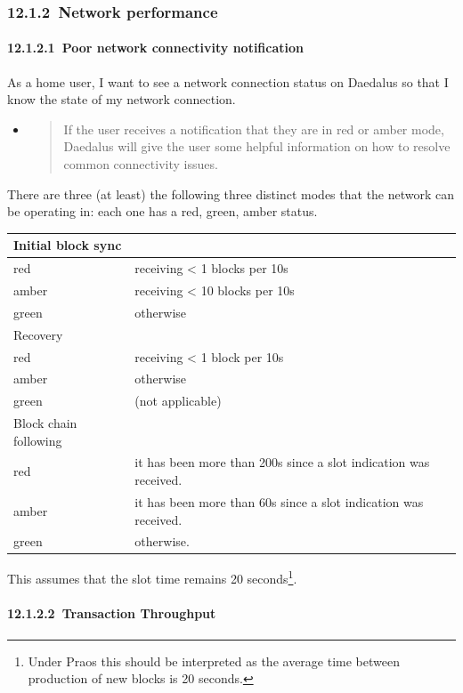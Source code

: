 \documentclass[11pt,a4paper]{article}
\begin{document}
\hypertarget{network-performance}{%
\subsubsection{​12.1.2​~Network performance}\label{network-performance}}

\hypertarget{poor-network-connectivity-notification}{%
\paragraph{​12.1.2.1​~Poor network connectivity notification
}\label{poor-network-connectivity-notification}}

As a home user, I want to see a network connection status on Daedalus so
that I know the state of my network connection.

\begin{itemize}
\item
  \begin{quote}
  If the user receives a notification that they are in red or amber
  mode, Daedalus will give the user some helpful information on how to
  resolve common connectivity issues.
  \end{quote}
\end{itemize}

There are three (at least) the following three distinct modes that the
network can be operating in: each one has a red, green, amber status.

\begin{longtable}[]{@{}ll@{}}
\toprule
Initial block sync &\tabularnewline
\midrule
\endhead
red & receiving \textless{} 1 blocks per 10s\tabularnewline
amber & receiving \textless{} 10 blocks per 10s\tabularnewline
green & otherwise\tabularnewline
Recovery &\tabularnewline
red & receiving \textless{} 1 block per 10s\tabularnewline
amber & otherwise\tabularnewline
green & (not applicable)\tabularnewline
Block chain following &\tabularnewline
red & it has been more than 200s since a slot indication was
received.\tabularnewline
amber & it has been more than 60s since a slot indication was
received.\tabularnewline
green & otherwise.\tabularnewline
\bottomrule
\end{longtable}

This assumes that the slot time remains 20 seconds\footnote{Under Praos
  this should be interpreted as the average time between production of
  new blocks is 20 seconds.}.

\hypertarget{transaction-throughput}{%
\paragraph{​12.1.2.2​~Transaction
Throughput}\label{transaction-throughput}}
\end{document}
